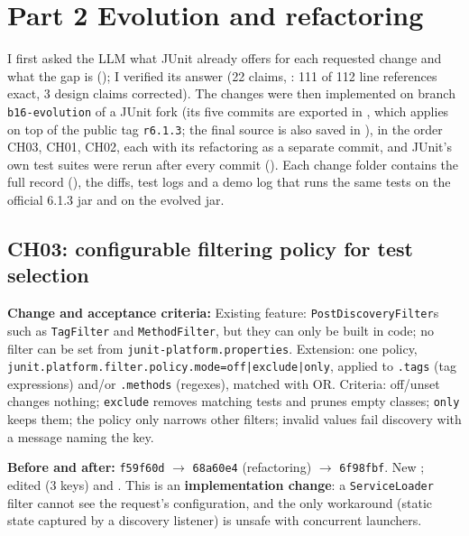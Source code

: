 \documentclass[11pt,a4paper]{article}
\newcommand{\entry}[1]{\textbf{#1:} }
\begin{document}
\section{Part 2 Evolution and refactoring}
I first asked the LLM what JUnit already offers for each requested change and what the gap is (); I verified its answer (22 claims, : 111 of 112 line references exact, 3 design claims corrected). The changes were then implemented on branch \texttt{b16-evolution} of a JUnit fork (its five commits are exported in , which applies on top of the public tag \texttt{r6.1.3}; the final source is also saved in ), in the order CH03, CH01, CH02, each with its refactoring as a separate commit, and JUnit's own test suites were rerun after every commit (). Each change folder contains the full record (), the diffs, test logs and a demo log that runs the same tests on the official 6.1.3 jar and on the evolved jar.

\subsection*{CH03: configurable filtering policy for test selection}
\entry{Change and acceptance criteria}Existing feature: \texttt{PostDiscoveryFilter}s such as \texttt{TagFilter} and \texttt{MethodFilter}, but they can only be built in code; no filter can be set from \texttt{junit-platform.properties}. Extension: one policy, \texttt{junit.platform.filter.policy.mode=off|exclude|only}, applied to \texttt{.tags} (tag expressions) and/or \texttt{.methods} (regexes), matched with OR. Criteria: off/unset changes nothing; \texttt{exclude} removes matching tests and prunes empty classes; \texttt{only} keeps them; the policy only narrows other filters; invalid values fail discovery with a message naming the key.

\entry{Before and after}\texttt{f59f60d} $\rightarrow$ \texttt{68a60e4} (refactoring) $\rightarrow$ \texttt{6f98fbf}. New ; edited  (3 keys) and . This is an \textbf{implementation change}: a \texttt{ServiceLoader} filter cannot see the request's configuration, and the only workaround (static state captured by a discovery listener) is unsafe with concurrent launchers.
\end{document}

